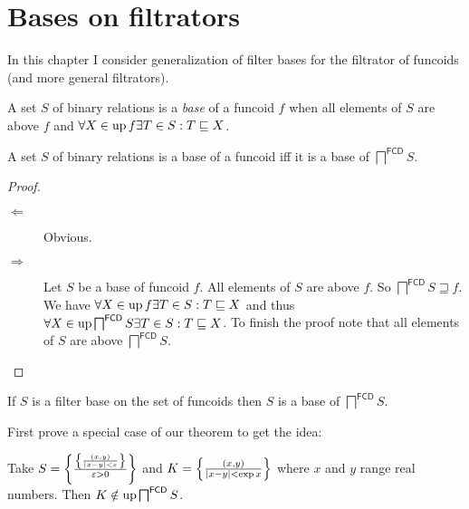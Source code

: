 \chapter{Bases on filtrators}

In this chapter I consider generalization of filter bases
for the filtrator of funcoids (and more general filtrators).


\begin{defn}
  A set $S$ of binary relations is a \emph{base} of a funcoid $f$ when all elements
  of $S$ are above $f$ and $\forall X \in \operatorname{up} f \exists T \in S : T
  \sqsubseteq X$.
\end{defn}

\begin{prop}
  A set $S$ of binary relations is a base of a funcoid iff it is a base of
  $\bigsqcap^{\mathsf{FCD}} S$.
\end{prop}

\begin{proof}
  ~
  \begin{description}
    \item[$\Leftarrow$] Obvious.
    
    \item[$\Rightarrow$] Let $S$ be a base of funcoid $f$. All elements of $S$
    are above $f$. So $\bigsqcap^{\mathsf{FCD}} S \sqsupseteq f$. We
    have $\forall X \in \operatorname{up} f \exists T \in S : T \sqsubseteq X$ and
    thus $\forall X \in \operatorname{up} \bigsqcap^{\mathsf{FCD}} S \exists T
    \in S : T \sqsubseteq X$. To finish the proof note that all elements of
    $S$ are above $\bigsqcap^{\mathsf{FCD}} S$.
  \end{description}
\end{proof}

\begin{thm}
  If $S$ is a filter base on the set of funcoids then $S$ is a base of
  $\bigsqcap^{\mathsf{FCD}} S$.
\end{thm}

First prove a special case of our theorem to get the idea:

\begin{example}
  Take $S = \left\{ \frac{
  \left\{ \frac{ (x, y) }{ | x - y | < \varepsilon }\right\}}{ \varepsilon > 0 }\right\}$ and $K = \left\{ \frac{ (x, y) }{
  | x - y | < \exp x }\right\}$ where $x$ and $y$ range real
  numbers. Then $K \notin \operatorname{up} \bigsqcap^{\mathsf{FCD}} S$.
\end{example}

